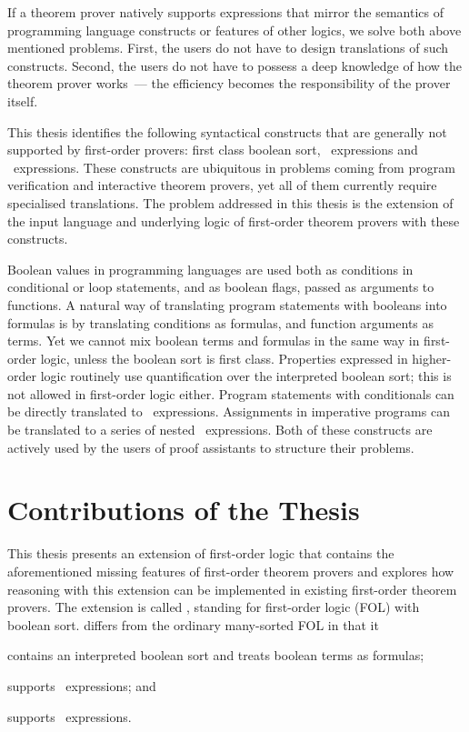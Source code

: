 If a theorem prover natively supports expressions that mirror the semantics of programming language constructs or features of other logics, we solve both above mentioned problems. First, the users do not have to design translations of such constructs. Second, the users do not have to possess a deep knowledge of how the theorem prover works~--- the efficiency becomes the responsibility of the prover itself.

This thesis identifies the following syntactical constructs that are generally not supported by first-order provers: first class boolean sort, \ITE\ expressions and \LETIN\ expressions. These constructs are ubiquitous in problems coming from program verification and interactive theorem provers, yet all of them currently require specialised translations. The problem addressed in this thesis is the extension of the input language and underlying logic of first-order theorem provers with these constructs.

Boolean values in programming languages are used both as conditions in conditional or loop statements, and as boolean flags, passed as arguments to functions. A natural way of translating program statements with booleans into formulas is by translating conditions as formulas, and function arguments as terms. Yet we cannot mix boolean terms and formulas in the same way in first-order logic, unless the boolean sort is first class. Properties expressed in higher-order logic routinely use quantification over the interpreted boolean sort; this is not allowed in first-order logic either. Program statements with conditionals can be directly translated to \ITE\ expressions. Assignments in imperative programs can be translated to a series of nested \LETIN\ expressions. Both of these constructs are actively used by the users of proof assistants to structure their problems. %

\section*{Contributions of the Thesis}
\label{sect:intro:contributions}
This thesis presents an extension of first-order logic that contains the aforementioned missing features of first-order theorem provers and explores how reasoning with this extension can be implemented in existing first-order theorem provers. The extension is called \folb{}, standing for first-order logic (FOL) with boolean sort. \folb{} differs from the ordinary many-sorted FOL in that it \begin{enumerate*}[label=(\roman*)]\item contains an interpreted boolean sort and treats boolean terms as formulas; \item supports \ITE\ expressions; and \item supports \LETIN\ expressions.\end{enumerate*}

